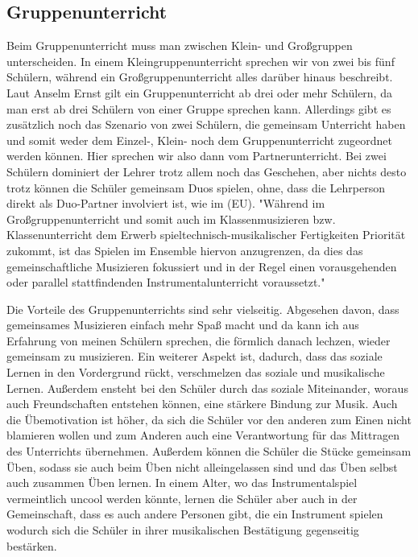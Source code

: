 \subsection{Gruppenunterricht} 
Beim Gruppenunterricht muss man zwischen Klein- und Großgruppen unterscheiden.
In einem Kleingruppenunterricht sprechen wir von zwei bis fünf Schülern, während
ein Großgruppenunterricht alles darüber hinaus beschreibt.
\autocite[219]{busch:grundwissen_instrumentalpaedagogik} Laut Anselm Ernst gilt
ein Gruppenunterricht ab drei oder mehr Schülern, da man erst ab drei Schülern
von einer Gruppe sprechen kann.
\autocite[79]{ernst:die_zukunftsfaehige_musikschule}
Allerdings gibt es zusätzlich noch das Szenario von zwei Schülern, die gemeinsam
Unterricht haben und somit weder dem Einzel-, Klein- noch dem Gruppenunterricht
zugeordnet werden können. Hier sprechen wir also dann vom
Partnerunterricht.\autocite[219]{busch:grundwissen_instrumentalpaedagogik} Bei
zwei Schülern dominiert der Lehrer trotz allem noch das Geschehen, aber nichts
desto trotz können die Schüler gemeinsam Duos spielen, ohne, dass die Lehrperson
direkt als Duo-Partner involviert ist, wie im (EU). "Während im
Großgruppenunterricht und somit auch im Klassenmusizieren bzw. Klassenunterricht
dem Erwerb spieltechnisch-musikalischer Fertigkeiten Priorität zukommt, ist das
Spielen im Ensemble hiervon anzugrenzen, da dies das gemeinschaftliche
Musizieren fokussiert und in der Regel einen vorausgehenden oder parallel
stattfindenden Instrumentalunterricht
voraussetzt."\autocite[219]{busch:grundwissen_instrumentalpaedagogik}

Die Vorteile des Gruppenunterrichts sind sehr vielseitig. Abgesehen davon, dass
gemeinsames Musizieren einfach mehr Spaß macht und da kann ich aus Erfahrung von
meinen Schülern sprechen, die förmlich danach lechzen, wieder gemeinsam zu
musizieren. Ein weiterer Aspekt ist, dadurch, dass das soziale Lernen in den
Vordergrund rückt, verschmelzen das soziale und musikalische Lernen. Außerdem
ensteht bei den Schüler durch das soziale Miteinander, woraus auch
Freundschaften entstehen können, eine stärkere Bindung zur Musik. Auch die
Übemotivation ist höher, da sich die Schüler vor den anderen zum Einen nicht
blamieren wollen und zum Anderen auch eine Verantwortung für das Mittragen des
Unterrichts übernehmen. Außerdem können die Schüler die Stücke gemeinsam Üben,
sodass sie auch beim Üben nicht alleingelassen sind und das Üben selbst auch
zusammen Üben lernen. In einem Alter, wo das Instrumentalspiel vermeintlich
uncool werden könnte, lernen die Schüler aber auch in der Gemeinschaft, dass es
auch andere Personen gibt, die ein Instrument spielen wodurch sich die Schüler
in ihrer musikalischen Bestätigung gegenseitig bestärken.
\autocite{ernst:die_zukunftsfaehige_musikschule}

